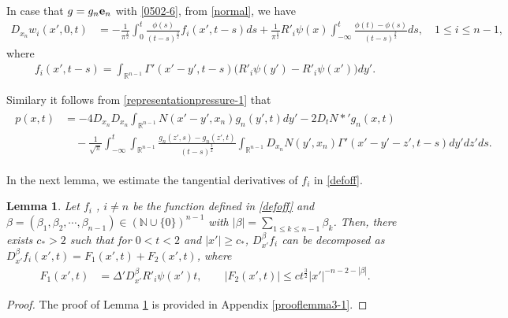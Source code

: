 \documentclass{amsart}
\newtheorem{lemma}[defn]{Lemma}
\numberwithin{equation}{section}
\newcommand {\be}{\beta}
\newcommand{\Rn}{{\mathbb R}^{n-1}}
\newcommand{\De}{\Delta}
\newcommand{\Ga}{\Gamma}
\begin{document}
In case that $g = g_n {\bf e}_n$ with \eqref{0502-6}, from \eqref{normal}, we have
 \begin{align} \label{shortg}
D_{x_n} w_i (x', 0,t) & =  - \frac1{\pi^\frac12}  \int_0^t  \frac{ \phi(s)}{(t-s)^\frac32}     f_i (x', t-s) ds    + \frac1{\pi^\frac12}  R'_i \psi(x) \int_{-\infty}^t     \frac{\phi(t) - \phi(s)}{(t-s)^\frac32}  ds, \quad  1 \leq i \leq n-1, 
\end{align}
where 
\begin{align}\label{defoff}
  f_i (x', t-s)  = \int_{\Rn}   \Ga'(x' -y', t-s) \big( R'_i \psi(y')   - R'_i \psi(x')    \big)  dy'.
\end{align}
 
Similary it follows from \eqref{representationpressure-1} that
\begin{align}\label{260321-1}
\begin{split}
p(x,t) 
& = -4 D_{x_n} D_{x_n}\int_{\Rn} N(x' -y', x_n) g_n (y', t) dy' - 2 D_t N*' g_n (x,t) \\
& \quad - \frac{1}{\sqrt{ \pi}} \int_{-\infty}^t \int_{\Rn}\frac{g_n (z',s) -g_n(z',t)}{(t -s)^{\frac{3}{2}}} 
  \int_{\Rn} D_{x_n} N(y', x_n) \Ga'(x'-y' -z',t-s) dy' dz' ds.
\end{split}
\end{align}


In the next lemma, we estimate the tangential derivatives of $f_i$ in \eqref{defoff}.

\begin{lemma}\label{lemma1116-1}
Let $ f_i$ , $i\neq n$  be the function defined in \eqref{defoff} and $ \be = (\be_1,\be_2, \cdots, \be_{n-1})   \in ( {\mathbb N} \cup \{ 0\} )^{n-1}$ with $ |\be| = \sum_{1 \leq k \leq n-1} \be_k$.
Then, there exists  $ c_* > 2$ such that for $ 0 < t <2$ and $ |x'| \geq c_*$, 
$D_{x'}^\be  f_i$ can be  decomposed as $ D_{x'}^\be  f_i(x',t) = F_1(x', t) + F_2(x', t)$, where 
\begin{align*}
F_1(x',t) &  =   \De'  D_{x'}^\be   R'_i \psi (x'  )    t, \qquad |F_2 (x',t)|   \leq c t^\frac32 |x'|^{-n -2 -|\be|}.
\end{align*}

\end{lemma}

 


\begin{proof}
 The proof of Lemma \ref{lemma1116-1} is provided in Appendix \ref{prooflemma3-1}.
 \end{proof}
\end{document}
